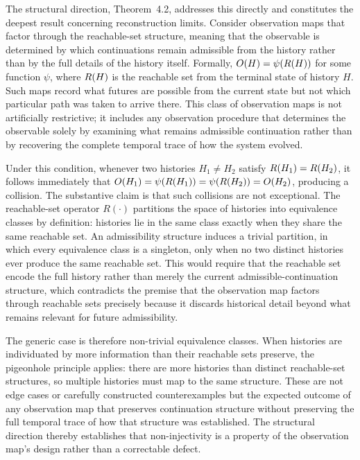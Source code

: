 The structural direction, Theorem~4.2, addresses this directly and constitutes the deepest result concerning reconstruction limits. Consider observation maps that factor through the reachable-set structure, meaning that the observable is determined by which continuations remain admissible from the history rather than by the full details of the history itself. Formally, $O(H) = \psi(R(H))$ for some function $\psi$, where $R(H)$ is the reachable set from the terminal state of history $H$. Such maps record what futures are possible from the current state but not which particular path was taken to arrive there. This class of observation maps is not artificially restrictive; it includes any observation procedure that determines the observable solely by examining what remains admissible continuation rather than by recovering the complete temporal trace of how the system evolved.

Under this condition, whenever two histories $H_1 \neq H_2$ satisfy $R(H_1) = R(H_2)$, it follows immediately that $O(H_1) = \psi(R(H_1)) = \psi(R(H_2)) = O(H_2)$, producing a collision. The substantive claim is that such collisions are not exceptional. The reachable-set operator $R(\cdot)$ partitions the space of histories into equivalence classes by definition: histories lie in the same class exactly when they share the same reachable set. An admissibility structure induces a trivial partition, in which every equivalence class is a singleton, only when no two distinct histories ever produce the same reachable set. This would require that the reachable set encode the full history rather than merely the current admissible-continuation structure, which contradicts the premise that the observation map factors through reachable sets precisely because it discards historical detail beyond what remains relevant for future admissibility.

The generic case is therefore non-trivial equivalence classes. When histories are individuated by more information than their reachable sets preserve, the pigeonhole principle applies: there are more histories than distinct reachable-set structures, so multiple histories must map to the same structure. These are not edge cases or carefully constructed counterexamples but the expected outcome of any observation map that preserves continuation structure without preserving the full temporal trace of how that structure was established. The structural direction thereby establishes that non-injectivity is a property of the observation map's design rather than a correctable defect.

